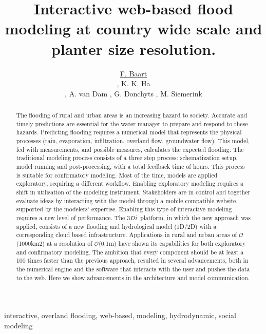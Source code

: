 \documentclass[a4paper]{article}
\title{Interactive web-based flood modeling at country wide scale and planter size resolution.}
\author{\underline{F. Baart}
  \address[A1]{\it{Deltares,
      Rotterdamseweg,
      Delft, The Netherlands (fedor.baart@deltares.nl, arthur.vandam@deltares.nl, gennadii.donchyts@deltares.nl)}},
  K. K. Ha
  \address[B1]{\it{Nelen \& Schuurmans,
      Zakkendragerssteeg,
      Utrecht, The Netherlands (jack.ha@nelen-schuurmans.nl, martijn.siemerink@nelen-schuurmans.nl)}},
  A. van Dam \addressmark[A1],
  G. Donchyts \addressmark[A1],
  M. Siemerink \addressmark[B1]
}
\DeclareRobustCommand{\orderof}{\ensuremath{\mathcal{O}}}
\DeclareRobustCommand{\threedi}{$3Di$~}
\begin{document}
\sffamily
\sansmath

\begin{abstract}
  The flooding of rural and urban areas is an increasing hazard to society. Accurate and timely predictions are essential for the water manager to prepare and respond to these hazards.
  Predicting flooding requires a numerical model that represents the physical processes (rain, evaporation, infiltration, overland flow, groundwater flow). This model, fed with measurements, and possible measures, calculates the expected flooding.
  The traditional modeling process consists of a three step process: schematization setup, model running and post-processing, with a total feedback time of hours.  This process is suitable for confirmatory modeling. Most of the time, models are applied exploratory, requiring a different workflow.
  Enabling exploratory modeling requires a shift in utilisation of the modeling instrument. Stakeholders are in control and together evaluate ideas by interacting with the model through a mobile compatible website, supported by the modelers’ expertise. Enabling this type of interactive modeling requires a new level of performance.
  The \threedi platform, in which the new approach was applied, consists of a new flooding and hydrological model (1D/2D) with a corresponding cloud based infrastructure. Applications in rural and urban areas of \orderof(1000km2) at a resolution of \orderof(0.1m) have shown its capabilities for both exploratory and confirmatory modeling.
  The ambition that every component should be at least a 100 times faster than the previous approach, resulted in several advancements, both in the numerical engine and the software that interacts with the user and pushes the data to the web. Here we show advancements in the architecture and model communication.

\end{abstract}
\begin{keyword}
  interactive, overland flooding, web-based, modeling, hydrodynamic, social modeling
\end{keyword}

\maketitle
\end{document}
